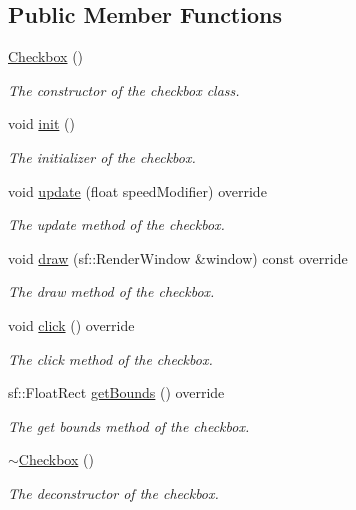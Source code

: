 \subsection*{Public Member Functions}
\begin{DoxyCompactItemize}
\item 
\hyperlink{class_checkbox_aa4caea91de8ef9ace8e299dec3bd2c37}{Checkbox} ()
\begin{DoxyCompactList}\small\item\em The constructor of the checkbox class. \end{DoxyCompactList}\item 
void \hyperlink{class_checkbox_a423af543a19a9e27b01c9c38566303c6}{init} ()
\begin{DoxyCompactList}\small\item\em The initializer of the checkbox. \end{DoxyCompactList}\item 
void \hyperlink{class_checkbox_af8103187e6df3f44b010a098d7473b55}{update} (float speed\+Modifier) override
\begin{DoxyCompactList}\small\item\em The update method of the checkbox. \end{DoxyCompactList}\item 
void \hyperlink{class_checkbox_a25403400f03b749091737bcba7457d17}{draw} (sf\+::\+Render\+Window \&window) const override
\begin{DoxyCompactList}\small\item\em The draw method of the checkbox. \end{DoxyCompactList}\item 
void \hyperlink{class_checkbox_a851b633a864cd4f3c99b235268238f42}{click} () override
\begin{DoxyCompactList}\small\item\em The click method of the checkbox. \end{DoxyCompactList}\item 
sf\+::\+Float\+Rect \hyperlink{class_checkbox_a90c0dacd03f2f51257e3c3a5c44b5978}{get\+Bounds} () override
\begin{DoxyCompactList}\small\item\em The get bounds method of the checkbox. \end{DoxyCompactList}\item 
\hyperlink{class_checkbox_a828c1436e32c8be0d9d395286d8e6bfe}{$\sim$\+Checkbox} ()
\begin{DoxyCompactList}\small\item\em The deconstructor of the checkbox. \end{DoxyCompactList}\end{DoxyCompactItemize}
